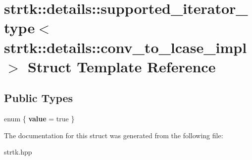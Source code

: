 \hypertarget{structstrtk_1_1details_1_1supported__iterator__type_3_01strtk_1_1details_1_1conv__to__lcase__impl_01_4}{\section{strtk\-:\-:details\-:\-:supported\-\_\-iterator\-\_\-type$<$ strtk\-:\-:details\-:\-:conv\-\_\-to\-\_\-lcase\-\_\-impl $>$ Struct Template Reference}
\label{structstrtk_1_1details_1_1supported__iterator__type_3_01strtk_1_1details_1_1conv__to__lcase__impl_01_4}
}
\subsection*{Public Types}
\begin{DoxyCompactItemize}
\item 
enum \{ {\bfseries value} = true
 \}
\end{DoxyCompactItemize}


The documentation for this struct was generated from the following file\-:\begin{DoxyCompactItemize}
\item 
strtk.\-hpp\end{DoxyCompactItemize}
